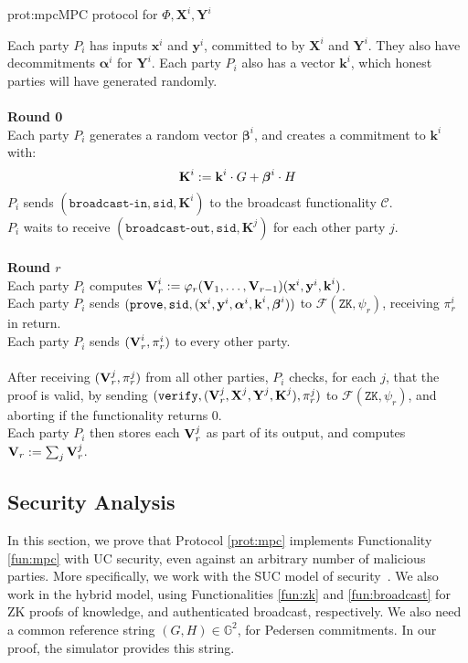 \begin{aprotocol}{prot:mpc}{MPC protocol for $\Phi, \textbf{X}^i, \textbf{Y}^i$}

Each party $P_i$ has inputs $\textbf{x}^i$ and $\textbf{y}^i$, committed to
by $\textbf{X}^i$ and $\textbf{Y}^i$.
They also have decommitments $\boldsymbol{\alpha}^i$ for $\textbf{Y}^i$.
Each party $P_i$ also has a vector $\textbf{k}^i$, which honest parties will
have generated randomly.\\
\\
\textbf{Round 0}\\
Each party $P_i$ generates a random vector $\boldsymbol{\beta}^i$, and creates
a commitment to $\textbf{k}^i$ with:
$$
\textbf{K}^i := \textbf{k}^i \cdot G + \boldsymbol{\beta}^i \cdot H
$$
$P_i$ sends $(\texttt{broadcast-in}, \texttt{sid}, \textbf{K}^i)$ to
the broadcast functionality $\mathcal{C}$.\\
$P_i$ waits to receive $(\texttt{broadcast-out}, \texttt{sid}, \textbf{K}^j)$
for each other party $j$.\\
\\
\textbf{Round $r$}\\
Each party $P_i$ computes $\textbf{V}^i_r := \varphi_r(\textbf{V}_1, \ldots, \textbf{V}_{r - 1})(\textbf{x}^i, \textbf{y}^i, \textbf{k}^i)$.\\
Each party $P_i$ sends $(\texttt{prove}, \texttt{sid}, (\textbf{x}^i, \textbf{y}^i, \boldsymbol{\alpha}^i, \textbf{k}^i, \boldsymbol{\beta}^i))$
to $\mathcal{F}(\texttt{ZK}, \psi_r)$, receiving $\pi^i_r$ in return.\\
Each party $P_i$ sends $(\textbf{V}^i_r, \pi^i_r)$ to every other party.\\
\\
After receiving $(\textbf{V}^j_r, \pi^j_r)$  from all other parties, $P_i$ checks,
for each $j$, that the proof is valid, by sending $(\texttt{verify}, (\textbf{V}^j_r, \textbf{X}^j, \textbf{Y}^j, \textbf{K}^j), \pi^j_r)$ to
$\mathcal{F}(\texttt{ZK}, \psi_r)$, and aborting if the functionality returns $0$.\\
Each party $P_i$ then stores each $\textbf{V}^j_r$ as part of its output,
and computes $\textbf{V}_r := \sum_j \textbf{V}^j_r$.
\end{aprotocol}

\subsection{Security Analysis}

In this section, we prove that Protocol \ref{prot:mpc} implements
Functionality \ref{fun:mpc} with UC security, even against an arbitrary
number of malicious parties.
More specifically, we work with the SUC model of security~\cite{canetti_simpler_2015}.
We also work in the hybrid model, using Functionalities
\ref{fun:zk} and \ref{fun:broadcast} for ZK proofs of knowledge,
and authenticated broadcast, respectively.
We also need a common reference string $(G, H) \in \mathbb{G}^2$, for
Pedersen commitments.
In our proof, the simulator provides this string.

